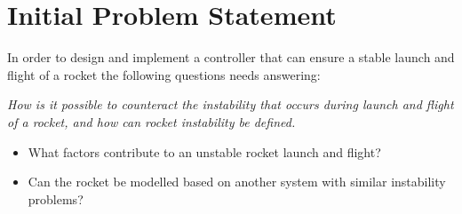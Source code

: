 \chapter{Initial Problem Statement}
In order to design and implement a controller that can ensure a stable launch and flight of a rocket the following questions needs answering: 

\textit{How is it possible to counteract the instability that occurs during launch and flight of a rocket, and how can rocket instability be defined.}
\bigbreak
\begin{itemize}[noitemsep]
\item What factors contribute to an unstable rocket launch and flight?
\item Can the rocket be modelled based on another system with similar instability problems?
\end{itemize}


